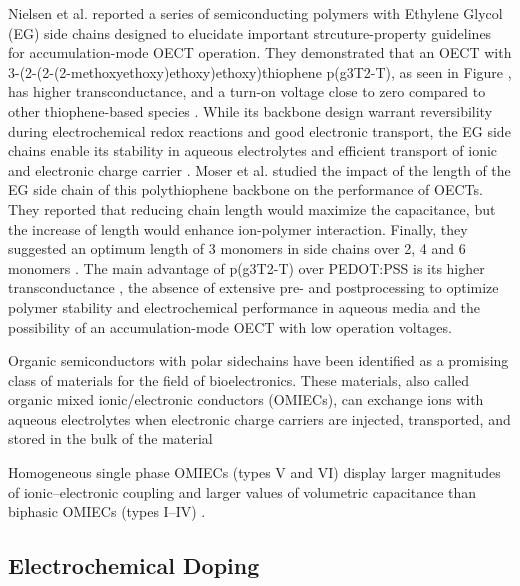 Nielsen et al. reported a series of semiconducting polymers with Ethylene Glycol (EG) side chains designed to elucidate important strcuture-property guidelines for accumulation-mode OECT operation. They demonstrated that an OECT with 3-(2-(2-(2-methoxyethoxy)ethoxy)ethoxy)thiophene p(g3T2-T), as seen in Figure , has higher transconductance, and a turn-on voltage close to zero compared to other thiophene-based species \cite{nielsenMolecularDesignSemiconducting2016}. While its backbone design warrant reversibility during electrochemical redox reactions and good electronic transport, the EG side chains enable its stability in aqueous electrolytes and efficient transport of ionic and electronic charge carrier \cite{moiaDesignEvaluationConjugated2019}. Moser et al. studied the impact of the length of the EG side chain of this polythiophene backbone on the performance of OECTs. They reported that reducing chain length would maximize the capacitance, but the increase of length would enhance ion-polymer interaction. Finally, they suggested an optimum length of 3 monomers in side chains over 2, 4 and 6 monomers \cite{moserEthyleneGlycolBasedSide2020}. The main advantage of p(g3T2-T) over PEDOT:PSS is its higher transconductance \cite{nielsenMolecularDesignSemiconducting2016}, the absence of extensive pre- and postprocessing to optimize polymer stability and electrochemical performance in aqueous media and the possibility of an accumulation-mode OECT with low operation voltages\cite{moserEthyleneGlycolBasedSide2020}.

Organic semiconductors with polar sidechains have been identified as a promising class of materials for the field of bioelectronics. These materials, also called organic mixed ionic/electronic conductors (OMIECs), can exchange ions with aqueous electrolytes when electronic charge carriers are injected, transported, and stored in the bulk of the material \cite{giovannittiEnergeticControlRedoxActive2020}

Homogeneous single phase OMIECs (types V and VI) display larger magnitudes of ionic–electronic coupling and larger values of volumetric capacitance than biphasic OMIECs (types I–IV) \cite{paulsenOrganicMixedIonic2020}. 



\subsection{Electrochemical Doping}

